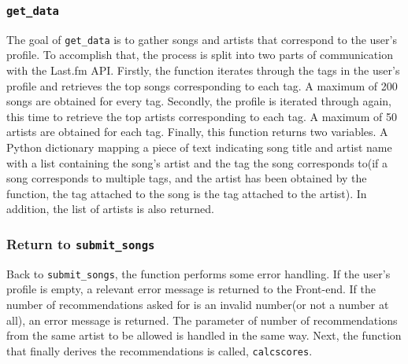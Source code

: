 \documentclass{l4proj}
\begin{document}
\subsubsection{\texttt{get\_data}}
The goal of \texttt{get\_data} is to gather songs and artists that correspond to the user's profile. To accomplish that, the process is split into two parts of communication with the Last.fm API. Firstly, the function iterates through the tags in the user's profile and retrieves the top songs corresponding to each tag. A maximum of 200 songs are obtained for every tag. Secondly, the profile is iterated through again, this time to retrieve the top artists corresponding to each tag. A maximum of 50 artists are obtained for each tag. Finally, this function returns two variables. A Python dictionary mapping a piece of text indicating song title and artist name with a list containing the song's artist and the tag the song corresponds to(if a song corresponds to multiple tags, and the artist has been obtained by the function, the tag attached to the song is the tag attached to the artist). In addition, the list of artists is also returned. 
\subsubsection{Return to \texttt{submit\_songs}}
Back to \texttt{submit\_songs}, the function performs some error handling. If the user's profile is empty, a relevant error message is returned to the Front-end. If the number of recommendations asked for is an invalid number(or not a number at all), an error message is returned. The parameter of number of recommendations from the same artist to be allowed is handled in the same way. Next, the function that finally derives the recommendations is called, \texttt{calcscores}.
\end{document}
